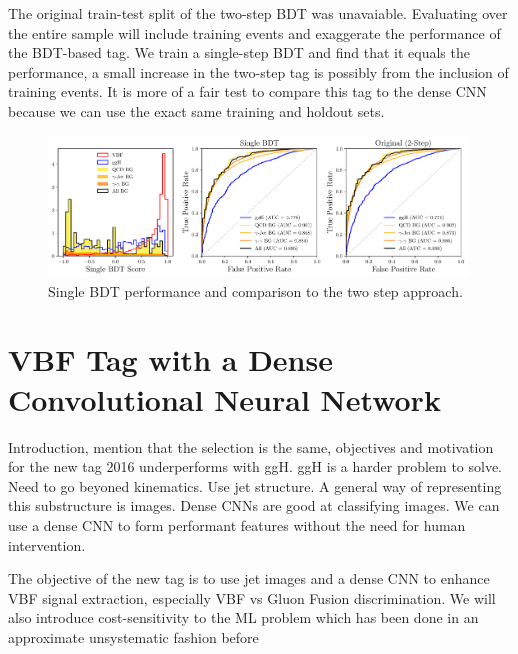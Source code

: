 The original train-test split of the two-step BDT was unavaiable. Evaluating over the entire sample will include training events and exaggerate the performance of the BDT-based tag. 
We train a single-step BDT and find that it equals the performance, a small increase in the two-step tag is possibly from the inclusion of training events. 
It is more of a fair test to compare this tag to the dense CNN because we can use the exact same training and holdout sets. 
\begin{figure}[h!]
    \includegraphics[width=0.99\textwidth]{figures/event_selection/dijet_BDT_PS_unw.pdf}
    \caption{Single BDT performance and comparison to the two step approach.}
    \label{fig:event_categorisation:single_BDT}
\end{figure}



















\section{VBF Tag with a Dense Convolutional Neural Network}
Introduction, mention that the selection is the same, objectives and motivation for the new tag
2016 underperforms with ggH. ggH is a harder problem to solve. Need to go beyoned kinematics. Use jet structure.
A general way of representing this substructure is images. Dense CNNs are good at classifying images. 
We can use a dense CNN to form performant features without the need for human intervention. 

The objective of the new tag is to use jet images and a dense CNN to enhance VBF signal extraction, especially VBF vs Gluon Fusion discrimination. 
We will also introduce cost-sensitivity to the ML problem which has been done in an approximate unsystematic fashion before

